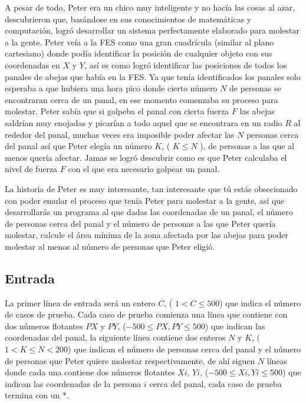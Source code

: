 \documentclass[letter,10pt]{article}
\begin{document}
A pesar de todo, Peter era un chico muy inteligente y no hacía las cosas al azar, descubrieron que, basándose en sus conocimientos de matemáticas y computación, logró desarrollar un sistema perfectamente elaborado para molestar a la gente. Peter veía a la FES como una gran cuadrícula (similar al plano cartesiano) donde podía identificar la posición de cualquier objeto con sus coordenadas en $X$ y $Y$, así es como logró identificar las posiciones de todos los panales de abejas que había en la FES. Ya que tenía identificados los panales solo esperaba a que hubiera una hora pico donde cierto número $N$ de personas se encontraran cerca de un panal, en ese momento comenzaba su proceso para molestar. Peter sabía que si golpeba el panal con cierta fuerza $F$ las abejas saldrían muy enojadas y picarían a todo aquel que se encontrara en un radio $R$ al rededor del panal, muchas veces era imposible poder afectar las $N$ personas cerca del panal así que Peter elegía un número $K$, ( $K \leq N$ ), de personas a las que al menos quería afectar. Jamas se logró descubrir como es que Peter calculaba el nivel de fuerza $F$ con el que era necesario golpear un panal.

La historia de Peter es muy interesante, tan interesante que tú estás obsecionado con poder emular el proceso que tenía Peter para molestar a la gente, así que desarrollarás un programa al que dadas las coordenadas de un panal, el número de personas cerca del panal y el número de personas a las que Peter quería molestar, calcule el área mínima de la zona afectada por las abejas para poder molestar al menos al número de personas que Peter eligió. 

\subsection*{Entrada}

La primer línea de entrada será un entero $C$, ( $1 < C \leq 500$) que indica el número de casos de prueba. Cada caso de prueba comienza una línea que contiene con dos números flotantes $PX$ y $PY$, ($-500 \leq PX,PY \leq 500$) que indican las coordenadas del panal, la siguiente línea contiene dos enteros $N$ y $K$, ($1 < K \leq N < 200$) que indican el número de personas cerca del panal y el número de personas que Peter quiere molestar respectivamente, de ahí siguen $N$ líneas donde cada una contiene dos números flotantes $Xi$, $Yi$, ($-500 \leq Xi,Yi \leq 500$) que indican las coordenadas de la persona $i$ cerca del panal, cada caso de prueba termina con un *.
\end{document}

